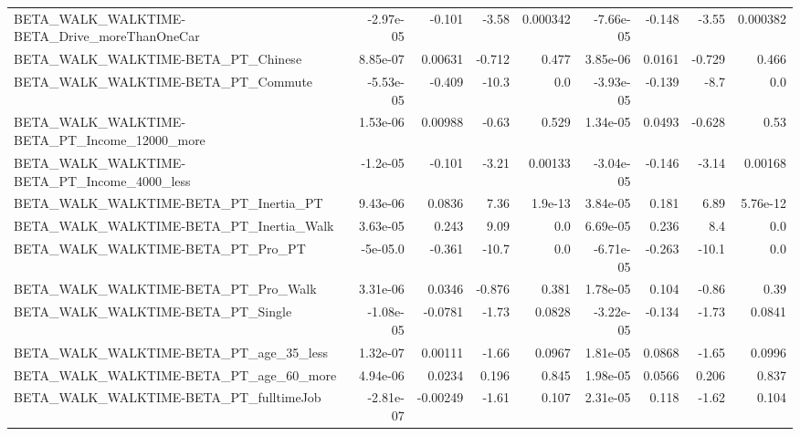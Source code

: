 \begin{tabular}{lrrrrrrrr}
BETA\_WALK\_WALKTIME-BETA\_Drive\_moreThanOneCar       &   -2.97e-05 &       -0.101 &    -3.58 & 0.000342 &  -7.66e-05 &      -0.148 &        -3.55 &      0.000382 \\
BETA\_WALK\_WALKTIME-BETA\_PT\_Chinese                 &    8.85e-07 &      0.00631 &   -0.712 &    0.477 &   3.85e-06 &      0.0161 &       -0.729 &         0.466 \\
BETA\_WALK\_WALKTIME-BETA\_PT\_Commute                 &   -5.53e-05 &       -0.409 &    -10.3 &      0.0 &  -3.93e-05 &      -0.139 &         -8.7 &           0.0 \\
BETA\_WALK\_WALKTIME-BETA\_PT\_Income\_12000\_more       &    1.53e-06 &      0.00988 &    -0.63 &    0.529 &   1.34e-05 &      0.0493 &       -0.628 &          0.53 \\
BETA\_WALK\_WALKTIME-BETA\_PT\_Income\_4000\_less        &    -1.2e-05 &       -0.101 &    -3.21 &  0.00133 &  -3.04e-05 &      -0.146 &        -3.14 &       0.00168 \\
BETA\_WALK\_WALKTIME-BETA\_PT\_Inertia\_PT              &    9.43e-06 &       0.0836 &     7.36 &  1.9e-13 &   3.84e-05 &       0.181 &         6.89 &      5.76e-12 \\
BETA\_WALK\_WALKTIME-BETA\_PT\_Inertia\_Walk            &    3.63e-05 &        0.243 &     9.09 &      0.0 &   6.69e-05 &       0.236 &          8.4 &           0.0 \\
BETA\_WALK\_WALKTIME-BETA\_PT\_Pro\_PT                  &    -5e-05.0 &       -0.361 &    -10.7 &      0.0 &  -6.71e-05 &      -0.263 &        -10.1 &           0.0 \\
BETA\_WALK\_WALKTIME-BETA\_PT\_Pro\_Walk                &    3.31e-06 &       0.0346 &   -0.876 &    0.381 &   1.78e-05 &       0.104 &        -0.86 &          0.39 \\
BETA\_WALK\_WALKTIME-BETA\_PT\_Single                  &   -1.08e-05 &      -0.0781 &    -1.73 &   0.0828 &  -3.22e-05 &      -0.134 &        -1.73 &        0.0841 \\
BETA\_WALK\_WALKTIME-BETA\_PT\_age\_35\_less             &    1.32e-07 &      0.00111 &    -1.66 &   0.0967 &   1.81e-05 &      0.0868 &        -1.65 &        0.0996 \\
BETA\_WALK\_WALKTIME-BETA\_PT\_age\_60\_more             &    4.94e-06 &       0.0234 &    0.196 &    0.845 &   1.98e-05 &      0.0566 &        0.206 &         0.837 \\
BETA\_WALK\_WALKTIME-BETA\_PT\_fulltimeJob             &   -2.81e-07 &     -0.00249 &    -1.61 &    0.107 &   2.31e-05 &       0.118 &        -1.62 &         0.104 \\

\end{tabular}
